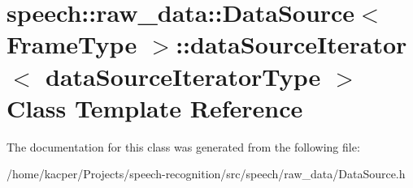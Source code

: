 \hypertarget{classspeech_1_1raw__data_1_1DataSource_1_1dataSourceIterator}{\section{speech\+:\+:raw\+\_\+data\+:\+:Data\+Source$<$ Frame\+Type $>$\+:\+:data\+Source\+Iterator$<$ data\+Source\+Iterator\+Type $>$ Class Template Reference}
\label{classspeech_1_1raw__data_1_1DataSource_1_1dataSourceIterator}
}


The documentation for this class was generated from the following file\+:\begin{DoxyCompactItemize}
\item 
/home/kacper/\+Projects/speech-\/recognition/src/speech/raw\+\_\+data/Data\+Source.\+h\end{DoxyCompactItemize}
